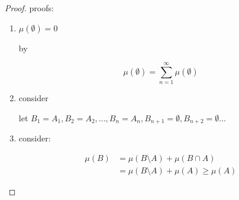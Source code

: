\begin{proof}
    proofs:

    \begin{enumerate}
        \item $\mu(\emptyset) = 0$

        by

        \[
            \mu\left(\emptyset\right) = \sum_{n=1}^{\infty}\mu\left(\emptyset\right)
        \]

        \item consider

        let $B_1 = A_1, B_2 = A_2,..., B_n =A_n, B_{n+1} = \emptyset, B_{n+2} = \emptyset ...$

        \item consider:

        \begin{align}
            \mu(B) &= \mu(B \setminus A) + \mu(B \cap A) \\
            &= \mu(B \setminus A) + \mu(A) \ge \mu(A)
        \end{align}

    \end{enumerate}
\end{proof}

